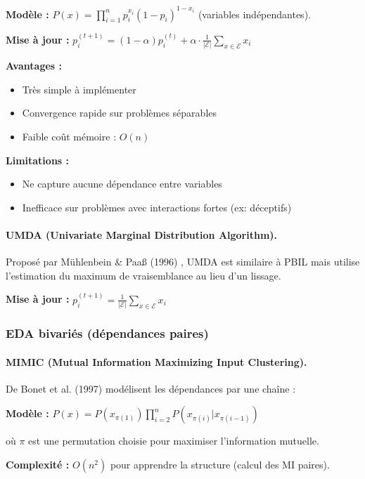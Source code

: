 \documentclass[12pt,a4paper]{article}
\theoremstyle{definition}
\theoremstyle{remark}
\begin{document}
\textbf{Modèle :} $P(x) = \prod_{i=1}^n p_i^{x_i} (1-p_i)^{1-x_i}$ (variables indépendantes).

\textbf{Mise à jour :} $p_i^{(t+1)} = (1-\alpha) p_i^{(t)} + \alpha \cdot \frac{1}{|\mathcal{E}|} \sum_{x \in \mathcal{E}} x_i$

\textbf{Avantages :}
\begin{itemize}
    \item Très simple à implémenter
    \item Convergence rapide sur problèmes séparables
    \item Faible coût mémoire : $O(n)$
\end{itemize}

\textbf{Limitations :}
\begin{itemize}
    \item Ne capture aucune dépendance entre variables
    \item Inefficace sur problèmes avec interactions fortes (ex: déceptifs)
\end{itemize}

\paragraph{UMDA (Univariate Marginal Distribution Algorithm).}
Proposé par Mühlenbein \& Paaß (1996) \cite{muhlenbein1996recombination}, UMDA est similaire à PBIL mais utilise l'estimation du maximum de vraisemblance au lieu d'un lissage.

\textbf{Mise à jour :} $p_i^{(t+1)} = \frac{1}{|\mathcal{E}|} \sum_{x \in \mathcal{E}} x_i$

\subsubsection{EDA bivariés (dépendances paires)}

\paragraph{MIMIC (Mutual Information Maximizing Input Clustering).}
De Bonet et al. (1997) \cite{debonet1997mimic} modélisent les dépendances par une chaîne :

\textbf{Modèle :} $P(x) = P(x_{\pi(1)}) \prod_{i=2}^n P(x_{\pi(i)} | x_{\pi(i-1)})$

où $\pi$ est une permutation choisie pour maximiser l'information mutuelle.

\textbf{Complexité :} $O(n^2)$ pour apprendre la structure (calcul des MI paires).
\end{document}
